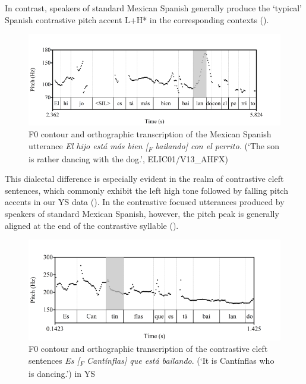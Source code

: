 \documentclass[output=paper]{langsci/langscibook}
\begin{document}
In contrast, speakers of standard Mexican Spanish generally produce the ‘typical’ Spanish contrastive pitch accent L+H* in the corresponding contexts ().

\begin{figure}
\includegraphics[width=\textwidth]{figures/UTH-img30.png}
 \caption{F0 contour and orthographic transcription of the Mexican Spanish utterance 
 \textit{El hijo está más bien [\textsubscript{F} bailando] con el perrito.} 
 (‘The son is rather dancing with the dog.’, ELIC01/V13\_AHFX)}
\label{fig:uth:8}
\end{figure}

This dialectal difference is especially evident in the realm of contrastive cleft sentences, which commonly exhibit the left high tone followed by falling pitch accents in our YS data (). In the contrastive focused utterances produced by speakers of standard Mexican Spanish, however, the pitch peak is generally aligned at the end of the contrastive syllable ().

\begin{figure}
\includegraphics[width=\textwidth]{figures/UTH-img31.png}
 \caption{F0 contour and orthographic transcription of the contrastive cleft sentences \textit{Es [\textsubscript{F}} \textit{Cantínflas] que está bailando}. (‘It is Cantínflas who is dancing.’) in YS}
\label{fig:uth:9}
\end{figure}
\end{document}
